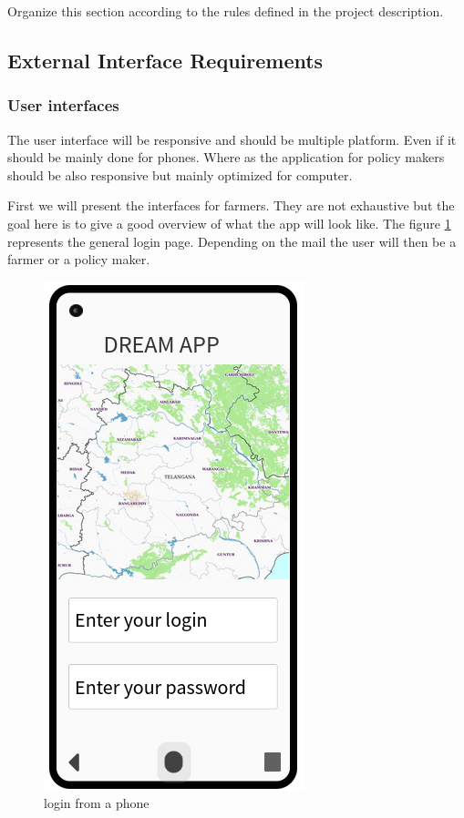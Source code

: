 Organize this section according to the rules defined in the project description. 

\subsection{External Interface Requirements}
\subsubsection{User interfaces}
The user interface will be responsive and should be multiple platform. Even if it should be mainly done for phones. \newline
Where as the application for policy makers should be also responsive but mainly optimized for computer.

First we will present the interfaces for farmers. They are not exhaustive but the goal here is to give a good overview of what the app will look like. The figure \ref{Fig:interface_login} represents the general login page. Depending on the mail the user will then be a farmer or a policy maker.
\begin{figure}[H]
	\centering
	\includegraphics[width=0.2\columnwidth]{Images/login.png}
	\caption{login from a phone}
	\label{Fig:interface_login}
\end{figure}

